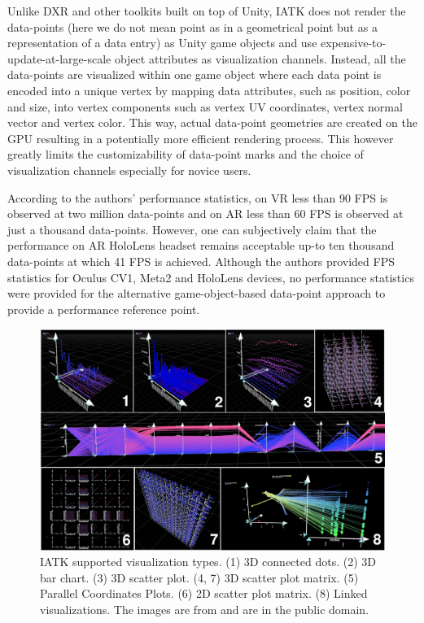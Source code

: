 \documentclass{vgtc}                          %
\begin{document}
\smallskip

\noindent Unlike DXR and other toolkits built on top of Unity, IATK does not
render the data-points (here we do not mean point as in a geometrical point but
as a representation of a data entry) as Unity game objects and use
expensive-to-update-at-large-scale object attributes as visualization channels.
Instead, all the data-points are visualized within one game object where each
data point is encoded into a unique vertex by mapping data attributes,
such as position, color and size, into vertex components such as vertex UV
coordinates, vertex normal vector and vertex color. This way, actual data-point
geometries are created on the GPU resulting in a potentially more
efficient rendering process. This however greatly limits the customizability
of data-point marks and the choice of visualization channels especially for
novice users.

\smallskip

\noindent According to the authors' performance statistics, on VR less than
90 FPS is observed at two million data-points and on AR less than 60 FPS is
observed at just a thousand data-points. However, one can subjectively claim
that the performance on AR HoloLens headset remains acceptable up-to ten
thousand data-points at which 41 FPS is achieved. Although the authors provided
FPS statistics for Oculus CV1, Meta2 and HoloLens devices, no performance
statistics were provided for the alternative game-object-based data-point
approach to provide a performance reference point.

\begin{figure}[tb]
	\centering
	\includegraphics[width=\columnwidth]{iatk}
	\caption[Caption for IATK]{IATK supported visualization types. (1) 3D
		connected dots. (2) 3D bar chart. (3) 3D scatter plot. (4, 7) 3D
		scatter plot matrix. (5) Parallel Coordinates Plots. (6) 2D scatter plot
        matrix. (8) Linked visualizations. The images are from \cite{iatk:repo}
		and are in the public domain.}
	\label{fig:iatk_visualizations}
\end{figure}
\end{document}
